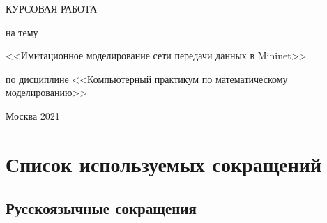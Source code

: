 \documentclass[
  13pt,
  fontsize=13pt,
  russian,
  a4paper,
,captions=tableheading
]{scrreprt}
\begin{document}
\begin{titlepage}
  \bigskip
  \bigskip

  \approvedStamp

  \bigskip
  \bigskip

  \begin{center}
  
        \MakeUppercase{Курсовая работа} \par
    \smallskip
            на тему \par
    \smallskip
            <<Имитационное моделирование сети передачи данных в
Mininet>>\par
    \smallskip
        \medskip%
    по дисциплине
    <<Компьютерный практикум по математическому моделированию>>
    \bigskip
      \end{center}

  \vspace{\fill}
  
  \bigskip%
  \authorTable


  \begin{center}
    \vspace*{\fill}
    {Москва}
    {2021}
  \end{center}
  
\end{titlepage}
\restoregeometry




\renewcommand*\contentsname{Содержание}
{
\setcounter{tocdepth}{2}
\tableofcontents
}
\listoffigures
{}
\hypertarget{ux441ux43fux438ux441ux43eux43a-ux438ux441ux43fux43eux43bux44cux437ux443ux435ux43cux44bux445-ux441ux43eux43aux440ux430ux449ux435ux43dux438ux439}{%
\chapter*{Список используемых
сокращений}\label{ux441ux43fux438ux441ux43eux43a-ux438ux441ux43fux43eux43bux44cux437ux443ux435ux43cux44bux445-ux441ux43eux43aux440ux430ux449ux435ux43dux438ux439}}

\hypertarget{ux440ux443ux441ux441ux43aux43eux44fux437ux44bux447ux43dux44bux435-ux441ux43eux43aux440ux430ux449ux435ux43dux438ux44f}{%
\section*{Русскоязычные
сокращения}\label{ux440ux443ux441ux441ux43aux43eux44fux437ux44bux447ux43dux44bux435-ux441ux43eux43aux440ux430ux449ux435ux43dux438ux44f}}
\end{document}
